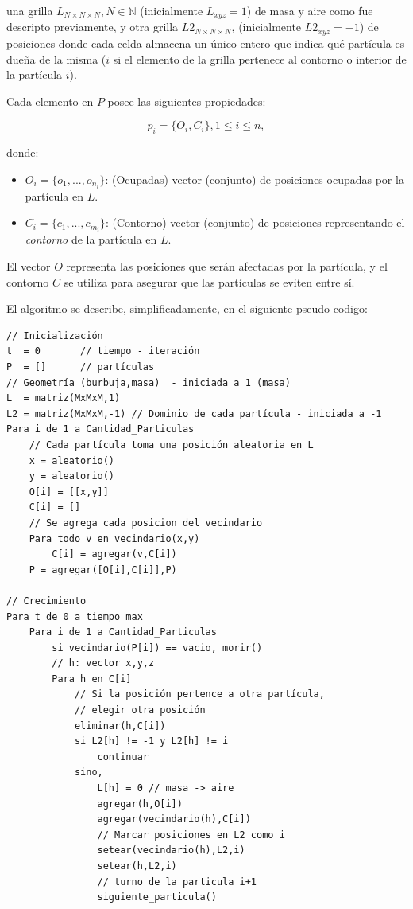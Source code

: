 \documentclass[oneside,a4paper,spanish,links]{amca}
\begin{document}
\noindent una grilla $L_{N\times N \times N}, N \in \mathbb{N} $ (inicialmente $L_{xyz}=1$) de masa y aire como fue descripto previamente, y otra grilla $L2_{N\times N \times N}$, (inicialmente $L2_{xyz}=-1$) de posiciones donde cada celda almacena un único entero que indica qu\'e part\'icula es due\~na de la misma ($i$ si el elemento de la grilla pertenece al contorno o interior de la part\'icula $i$).

Cada elemento en $P$ posee las siguientes propiedades:

\begin{equation}
  p_{i} = \{O_{i}, C_{i}\}, 1 \le i \le n,
\end{equation}

\noindent donde:

\begin{itemize}
\item $O_{i} = \{o_{1}, ... , o_{n_{i}}\}$: (Ocupadas) vector (conjunto) de posiciones ocupadas por la part\'icula en $L$.

\item $C_{i} = \{c_{1}, ... , c_{m_{i}}\}$: (Contorno) vector (conjunto) de posiciones representando el {\em contorno} de la part\'icula en $L$.
\end{itemize}

El vector $O$ representa las posiciones que ser\'an afectadas por la part\'icula, y el contorno $C$ se utiliza para asegurar que las part\'iculas se eviten entre s\'i.

El algoritmo se describe, simplificadamente, en el siguiente pseudo-codigo: 

\begin{verbatim}
// Inicialización
t  = 0       // tiempo - iteración
P  = []      // partículas
// Geometría (burbuja,masa)  - iniciada a 1 (masa)
L  = matriz(MxMxM,1)  
L2 = matriz(MxMxM,-1) // Dominio de cada partícula - iniciada a -1
Para i de 1 a Cantidad_Particulas
    // Cada partícula toma una posición aleatoria en L
    x = aleatorio()
    y = aleatorio()
    O[i] = [[x,y]]
    C[i] = []
    // Se agrega cada posicion del vecindario
    Para todo v en vecindario(x,y)
        C[i] = agregar(v,C[i])
    P = agregar([O[i],C[i]],P)

// Crecimiento
Para t de 0 a tiempo_max
    Para i de 1 a Cantidad_Particulas
        si vecindario(P[i]) == vacio, morir()
        // h: vector x,y,z
        Para h en C[i]
            // Si la posición pertence a otra partícula,
            // elegir otra posición
            eliminar(h,C[i])
            si L2[h] != -1 y L2[h] != i 
                continuar
            sino, 
                L[h] = 0 // masa -> aire
                agregar(h,O[i])
                agregar(vecindario(h),C[i])
                // Marcar posiciones en L2 como i
                setear(vecindario(h),L2,i)
                setear(h,L2,i)
                // turno de la particula i+1
                siguiente_particula()
    
        

\end{verbatim} 
\end{document}
